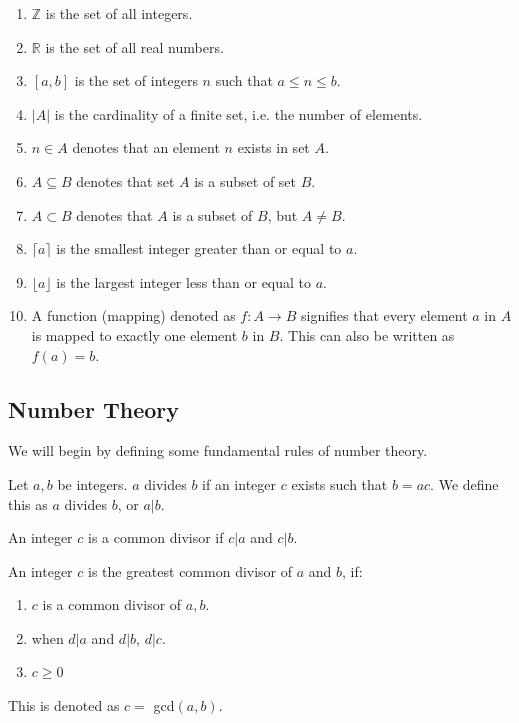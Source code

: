 \begin{enumerate}
	\item $\mathbb{Z}$ is the set of all integers.
	\item $\mathbb{R}$ is the set of all real numbers.
	\item $[a,b]$ is the set of integers $n$ such that $a\le n \le b$.
	\item $|A|$ is the cardinality of a finite set, i.e. the number of elements.
	\item $n \in A$ denotes that an element $n$ exists in set $A$.
	\item $A \subseteq B$ denotes that set $A$ is a subset of set $B$.
	\item $A \subset B$ denotes that $A$ is a subset of $B$, but $A \neq B$.
	\item $\lceil a \rceil$ is the smallest integer greater than or equal to $a$.
	\item $\lfloor a \rfloor$ is the largest integer less than or equal to $a$.
	\item A function (mapping) denoted as $f : A \rightarrow B$ signifies that every element $a$ in $A$ is mapped to exactly one element $b$ in $B$. This can also be written as $f(a) = b$.
\end{enumerate}

\subsection{Number Theory}

We will begin by defining some fundamental rules of number theory. 

\begin{mathdef}
	Let $a,b$ be integers. $a$ divides $b$ if an integer $c$ exists such that $b = ac$. We define this as $a$ divides $b$, or $a|b$.
\end{mathdef}

\begin{mathdef}
	An integer $c$ is a common divisor if $c|a$ and $c|b$.
\end{mathdef}

\begin{mathdef}
	An integer $c$ is the greatest common divisor of $a$ and $b$, if:
	\begin{enumerate}
		\item $c$ is a common divisor of $a,b$.
		\item when $d|a$ and $d|b$, $d|c$.
		\item $c\ge0$
	\end{enumerate}
	This is denoted as $c = $ gcd$(a,b)$.
\end{mathdef}

